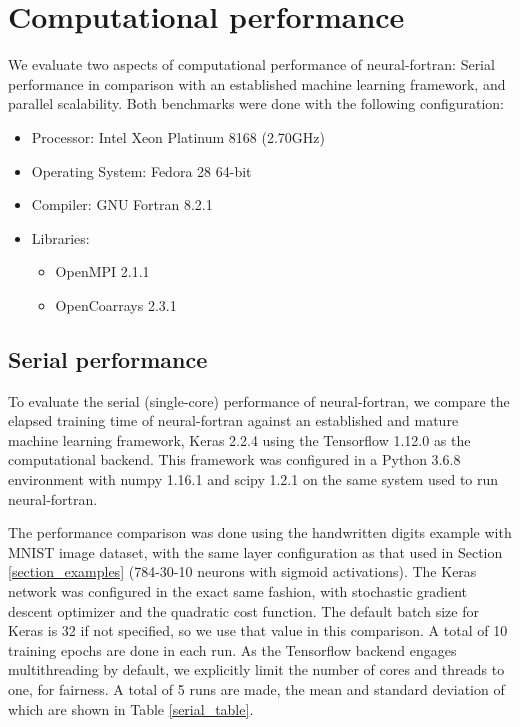 \documentclass[sigplan, review=false, screen=true, balance=true]{acmart}
\begin{document}
\section{Computational performance} \label{section_performance}

We evaluate two aspects of computational performance of neural-fortran:
Serial performance in comparison with an established machine learning framework,
and parallel scalability. Both benchmarks were done with the following
configuration:

\begin{itemize}
  \item Processor: Intel Xeon Platinum 8168 (2.70GHz)
  \item Operating System: Fedora 28 64-bit
  \item Compiler: GNU Fortran 8.2.1
  \item Libraries:
  \begin{itemize}
    \item OpenMPI 2.1.1
    \item OpenCoarrays 2.3.1
  \end{itemize}
\end{itemize}

\subsection{Serial performance}

To evaluate the serial (single-core) performance of neural-fortran,
we compare the elapsed training time of neural-fortran against an established
and mature machine learning framework, Keras 2.2.4 \citep{chollet15} using the
Tensorflow 1.12.0 \citep{abadi16} as the computational backend. This framework
was configured in a Python 3.6.8 environment with numpy 1.16.1 and scipy 1.2.1
on the same system used to run neural-fortran.

The performance comparison was done using the handwritten digits example
with MNIST image dataset, with the same layer configuration as that used
in Section \ref{section_examples} (784-30-10 neurons with sigmoid activations).
The Keras network was configured in the exact same fashion, with stochastic
gradient descent optimizer and the quadratic cost function. The default batch
size for Keras is 32 if not specified, so we use that value in this comparison.
A total of 10 training epochs are done in each run.
As the Tensorflow backend engages multithreading by default, we explicitly
limit the number of cores and threads to one, for fairness.
A total of 5 runs are made, the mean and standard deviation of which are shown
in Table \ref{serial_table}.
\end{document}
